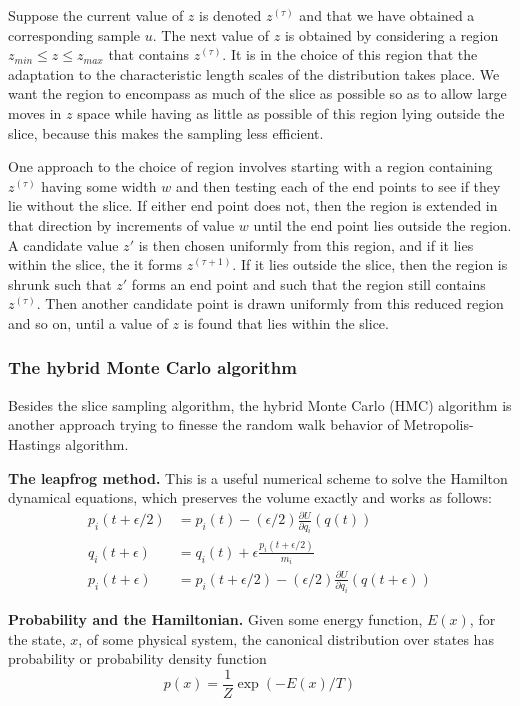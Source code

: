 \documentclass[a4paper]{book}
\begin{document}
Suppose the current value of $z$ is denoted $z^{(\tau)}$ and that we have obtained a corresponding sample $u$. The next value of $z$ is obtained by considering a region $z_{min} \leq z \leq z_{max}$ that contains $z^{(\tau)}$. It is in the choice of this region that the adaptation to the characteristic length scales of the distribution takes place. We want the region to encompass as much of the slice as possible so as to allow large moves in $z$ space while having as little as possible of this region lying outside the slice, because this makes the sampling less efficient.

One approach to the choice of region involves starting with a region containing $z^{(\tau)}$ having some width $w$ and then testing each of the end points to see if they lie without the slice. If either end point does not, then the region is extended in that direction by increments of value $w$ until the end point lies outside the region. A candidate value $z'$ is then chosen uniformly from this region, and if it lies within the slice, the it forms $z^{(\tau+1)}$. If it lies outside the slice, then the region is shrunk such that $z'$ forms an end point and such that the region still contains $z^{(\tau)}$. Then another candidate point is drawn uniformly from this reduced region and so on, until a value of $z$ is found that lies within the slice.
\subsubsection{The hybrid Monte Carlo algorithm}
Besides the slice sampling algorithm, the hybrid Monte Carlo (HMC) algorithm is another approach trying to finesse the random walk behavior of Metropolis-Hastings algorithm.

\textbf{The leapfrog method.} This is a useful numerical scheme to solve the Hamilton dynamical equations, which preserves the volume exactly and works as follows:
\begin{align}
	p_i(t+\epsilon/2) &= p_i(t) - (\epsilon/2)\frac{\partial U}{\partial q_i} (q(t)) \\
	q_i(t+ \epsilon) &= q_i(t) + \epsilon \frac{p_i(t+\epsilon/2)}{m_i} \\
	p_i(t+\epsilon) &= p_i(t+\epsilon/2) - (\epsilon/2)\frac{\partial U}{\partial q_i}(q(t+\epsilon))
\end{align}

\textbf{Probability and the Hamiltonian.} Given some energy function, $E(x)$, for the state, $x$, of some physical system, the canonical distribution over states has probability or probability density function
\begin{equation}
	p(x) = \frac{1}{Z} \exp (-E(x)/T)
\end{equation}
\end{document}
